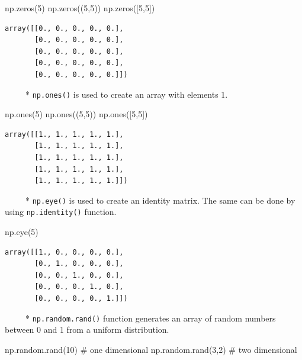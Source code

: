 \documentclass[
  letterpaper,
  DIV=11,
  numbers=noendperiod]{scrreprt}
\newenvironment{Shaded}{\begin{snugshade}}{\end{snugshade}}
\newcommand{\CommentTok}[1]{\textcolor[rgb]{0.37,0.37,0.37}{#1}}
\newcommand{\DecValTok}[1]{\textcolor[rgb]{0.68,0.00,0.00}{#1}}
\newcommand{\NormalTok}[1]{\textcolor[rgb]{0.00,0.23,0.31}{#1}}
\begin{document}
\begin{Shaded}
\begin{Highlighting}[]
\NormalTok{np.zeros(}\DecValTok{5}\NormalTok{)}
\NormalTok{np.zeros((}\DecValTok{5}\NormalTok{,}\DecValTok{5}\NormalTok{))}
\NormalTok{np.zeros([}\DecValTok{5}\NormalTok{,}\DecValTok{5}\NormalTok{])}
\end{Highlighting}
\end{Shaded}

\begin{verbatim}
array([[0., 0., 0., 0., 0.],
       [0., 0., 0., 0., 0.],
       [0., 0., 0., 0., 0.],
       [0., 0., 0., 0., 0.],
       [0., 0., 0., 0., 0.]])
\end{verbatim}

~~~~~* \texttt{np.ones()} is used to create an array with elements 1.

\begin{Shaded}
\begin{Highlighting}[]
\NormalTok{np.ones(}\DecValTok{5}\NormalTok{)}
\NormalTok{np.ones((}\DecValTok{5}\NormalTok{,}\DecValTok{5}\NormalTok{))}
\NormalTok{np.ones([}\DecValTok{5}\NormalTok{,}\DecValTok{5}\NormalTok{])}
\end{Highlighting}
\end{Shaded}

\begin{verbatim}
array([[1., 1., 1., 1., 1.],
       [1., 1., 1., 1., 1.],
       [1., 1., 1., 1., 1.],
       [1., 1., 1., 1., 1.],
       [1., 1., 1., 1., 1.]])
\end{verbatim}

~~~~~* \texttt{np.eye()} is used to create an identity matrix. The same
can be done by using \texttt{np.identity()} function.

\begin{Shaded}
\begin{Highlighting}[]
\NormalTok{np.eye(}\DecValTok{5}\NormalTok{)}
\end{Highlighting}
\end{Shaded}

\begin{verbatim}
array([[1., 0., 0., 0., 0.],
       [0., 1., 0., 0., 0.],
       [0., 0., 1., 0., 0.],
       [0., 0., 0., 1., 0.],
       [0., 0., 0., 0., 1.]])
\end{verbatim}

~~~~~* \texttt{np.random.rand()} function generates an array of random
numbers between 0 and 1 from a uniform distribution.

\begin{Shaded}
\begin{Highlighting}[]
\NormalTok{np.random.rand(}\DecValTok{10}\NormalTok{) }\CommentTok{\# one dimensional }
\NormalTok{np.random.rand(}\DecValTok{3}\NormalTok{,}\DecValTok{2}\NormalTok{) }\CommentTok{\# two dimensional }
\end{Highlighting}
\end{Shaded}
\end{document}
